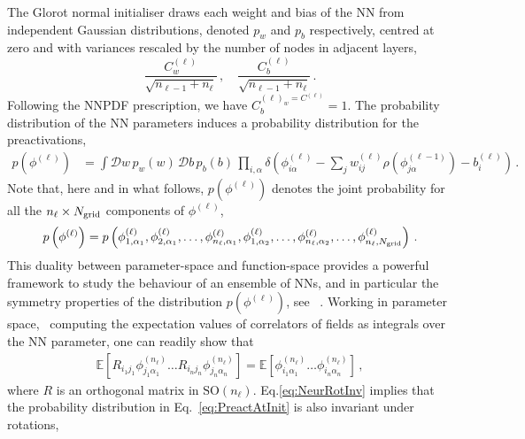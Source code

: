 The Glorot normal initialiser draws each weight and bias of the NN from independent Gaussian
distributions, denoted $p_w$ and $p_b$ respectively, centred at zero and with variances
rescaled by the number of nodes in adjacent layers,
\begin{equation}
    \label{eq:RescaledGlorotVariances}
    \frac{C^{(\ell)}_{w}}{\sqrt{n_{\ell-1} + n_{\ell}}}\, ,
    \quad \frac{C^{(\ell)}_{b}}{\sqrt{n_{\ell-1} + n_{\ell}}}\, .
\end{equation}
Following the NNPDF prescription, we have $C^{(\ell)_{w}=C^(\ell)}_{b}=1$. 
The probability distribution of the NN parameters induces a probability distribution for the
preactivations,
\begin{align}
    \label{eq:PreactAtInit}
    p\left(\phi^{(\ell)}\right)
      &= \int \mathcal{D}w\, p_w(w)\,
        \mathcal{D}b\, p_b(b)\, \prod_{i,\alpha}
        \delta\left(
          \phi^{(\ell)}_{i\alpha} - \sum_{j} w^{(\ell)}_{ij}
          \rho\left(\phi^{(\ell-1)}_{j\alpha}\right)
          - b^{(\ell)}_i
          \right)\, .
\end{align}
Note that, here and in what follows, $p(\phi^{(\ell)})$ denotes the joint probability for all the
$n_{\ell}\times N_{\mathrm{grid}}$ components of $\phi^{(\ell)}$,
\begin{align}
    \label{eq:ExplIndices}
    p\left(\phi^{(\ell)}\right) = p\left(\phi^{(\ell)}_{1,\alpha_1}, \phi^{(\ell)}_{2,\alpha_1}, \ldots,
        \phi^{(\ell)}_{n_\ell,\alpha_1}, \phi^{(\ell)}_{1,\alpha_2}, \ldots, \phi^{(\ell)}_{n_\ell,\alpha_2},
        \ldots,
        \phi^{(\ell)}_{n_\ell,N_{\mathrm{grid}}}\right)\, .
\end{align}
This duality between parameter-space and function-space provides a powerful framework to study
the behaviour of an ensemble of NNs, and in particular the symmetry properties of the distribution
$p(\phi^{(\ell)})$, see \eg~\cite{Maiti:2021fpy}. Working in parameter space, \ie\ computing the
expectation values of correlators of fields as integrals over the NN parameter, one can readily
show that
\begin{align}
    \label{eq:NeurRotInv}
    \mathbb{E}\left[
        R_{i_1j_1} \phi^{(n_\ell)}_{j_1 \alpha_1} \ldots
        R_{i_nj_n} \phi^{(n_\ell)}_{j_n \alpha_n}
    \right] =
    \mathbb{E}\left[
        \phi^{(n_\ell)}_{i_1 \alpha_1} \ldots
        \phi^{(n_\ell)}_{i_n \alpha_n}
    \right]\, ,
\end{align}
where $R$ is an orthogonal matrix in $\text{SO}(n_{\ell})$. Eq.\eqref{eq:NeurRotInv} implies
that the probability distribution in Eq.~\eqref{eq:PreactAtInit} is also invariant under rotations,
